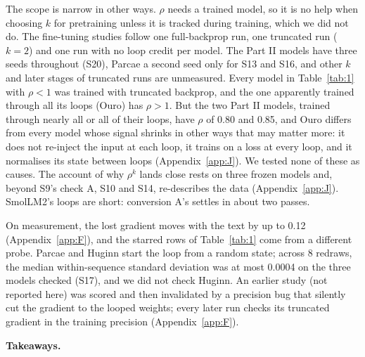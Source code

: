 \documentclass[10pt]{article}
\begin{document}
The scope is narrow in other ways. $\rho$ needs a trained model, so it is no help when choosing $k$ for pretraining unless it is tracked during training, which we did not do. The fine-tuning studies follow one full-backprop run, one truncated run ($k = 2$) and one run with no loop credit per model. The Part II models have three seeds throughout (S20), Parcae a second seed only for S13 and S16, and other $k$ and later stages of truncated runs are unmeasured. Every model in Table~\ref{tab:1} with $\rho < 1$ was trained with truncated backprop, and the one apparently trained through all its loops (Ouro) has $\rho > 1$. But the two Part II models, trained through nearly all or all of their loops, have $\rho$ of 0.80 and 0.85, and Ouro differs from every model whose signal shrinks in other ways that may matter more: it does not re-inject the input at each loop, it trains on a loss at every loop, and it normalises its state between loops (Appendix~\ref{app:J}). We tested none of these as causes. The account of why $\rho^{k}$ lands close rests on three frozen models and, beyond S9's check A, S10 and S14, re-describes the data (Appendix~\ref{app:J}). SmolLM2's loops are short: conversion A's settles in about two passes.

On measurement, the lost gradient moves with the text by up to 0.12 (Appendix~\ref{app:F}), and the starred rows of Table~\ref{tab:1} come from a different probe. Parcae and Huginn start the loop from a random state; across 8 redraws, the median within-sequence standard deviation was at most 0.0004 on the three models checked (S17), and we did not check Huginn. An earlier study (not reported here) was scored and then invalidated by a precision bug that silently cut the gradient to the looped weights; every later run checks its truncated gradient in the training precision (Appendix~\ref{app:F}).

\textbf{Takeaways.}
\end{document}
